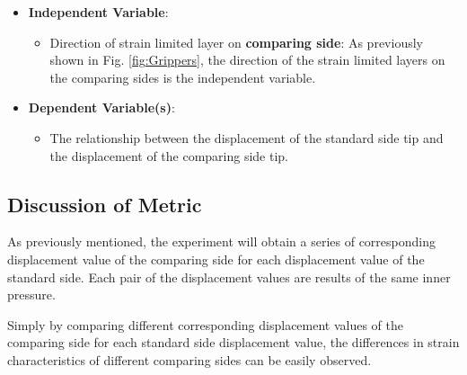 \documentclass[conference]{IEEEtran}
\begin{document}
\begin{itemize}
    \item \textbf{Independent Variable}: 
        \begin{itemize}
            \item Direction of strain limited layer on \textbf{comparing side}: As previously shown in Fig. \ref{fig:Grippers}, the direction of the strain limited layers on the comparing sides is the independent variable. 
        \end{itemize}
    \item \textbf{Dependent Variable(s)}: 
         \begin{itemize}
             \item The relationship between the displacement of the standard side tip and the displacement of the comparing side tip.
         \end{itemize}
\end{itemize}

\subsection{Discussion of Metric}

As previously mentioned, the experiment will obtain a series of corresponding displacement value of the comparing side for each displacement value of the standard side. Each pair of the displacement values are results of the same inner pressure.

 Simply by comparing different corresponding displacement values of the comparing side for each standard side displacement value, the differences in strain characteristics of different comparing sides can be easily observed.
\end{document}
